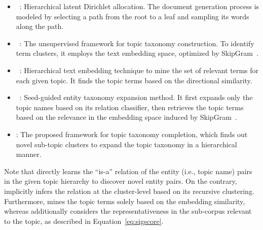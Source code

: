 \begin{itemize}
    \item \textbf{\hlda}~\cite{blei2003hierarchical}: Hierarchical latent Dirichlet allocation.
    The document generation process is modeled by selecting a path from the root to a leaf and sampling its words along the path. 
    
    \item \textbf{\taxogen}~\cite{zhang2018taxogen}: The unsupervised framework for topic taxonomy construction. 
    To identify term clusters, it employs the text embedding space, optimized by SkipGram~\cite{mikolov2013distributed}.
    
    
    \item \textbf{\josh}~\cite{meng2020hierarchical}: Hierarchical text embedding technique to mine the set of relevant terms for each given topic. 
    It finds the topic terms based on the directional similarity.
    
    \item \textbf{\corel}~\cite{huang2020corel}: Seed-guided entity taxonomy expansion method.
    It first expands only the topic names based on its relation classifier, then retrieves the topic terms based on the relevance in the embedding space induced by SkipGram~\cite{mikolov2013distributed}.
    
    \item \textbf{\proposed}: The proposed framework for topic taxonomy completion, which finds out novel sub-topic clusters to expand the topic taxonomy in a hierarchical manner.
\end{itemize}
Note that \corel directly learns the ``is-a'' relation of the entity (i.e., topic name) pairs in the given topic hierarchy to discover novel entity pairs.
On the contrary, \proposed implicitly infers the relation at the cluster-level based on its recursive clustering.
Furthermore, \corel mines the topic terms solely based on the embedding similarity, whereas \proposed additionally considers the representativeness in the sub-corpus relevant to the topic, as described in Equation~\eqref{eq:sigscore}.

